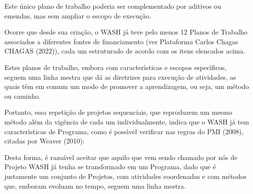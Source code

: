 \documentclass[
12pt,		%
openright,	%
twoside,  %
a4paper,			%
chapter=TITLE,		%
english,			%
french,				%
spanish,			%
brazil				%
]{USPSC-classe/USPSC}
\begin{document}
Este \'unico plano de trabalho poderia ser complementado por aditivos ou emendas, mas sem ampliar o escopo de execu\c{c}\~ao.









Ocorre que desde sua cria\c{c}\~ao, o WASH j\'a teve pelo menos 12 Planos de Trabalho associados a diferentes fontes de financiamento (ver Plataforma Carlos Chagas CHAGAS (2022)), cada um estruturado de acordo com os itens elencados acima.









Estes planos de trabalho, embora com caracter\'{\i}sticas e escopos espec\'{\i}ficos, seguem uma linha mestra que d\'a as diretrizes para execu\c{c}\~ao de atividades, as quais t\^em em comum um modo de promover a aprendizagem, ou seja, um m\'etodo ou \textquotedbl caminho\textquotedbl .









Portanto, essa repeti\c{c}\~ao de projetos sequenciais, que reproduzem um mesmo m\'etodo al\'em da vig\^encia de cada um individualmente, indica que o WASH j\'a tem caracter\'{\i}sticas de Programa, como \'e poss\'{\i}vel verificar nas regras do  PMI (2008), citadas por  Weaver (2010):










\noindent\begin{center}\mbox{\centering{}}\end{center}


Desta forma, \'e razo\'avel aceitar que aquilo que vem sendo chamado por n\'os de Projeto WASH j\'a tenha se transformado em um Programa, dado que \'e justamente um conjunto de Projetos, com atividades coordenadas e com m\'etodos que, emboram evoluam no tempo, seguem uma linha mestra.
\end{document}
